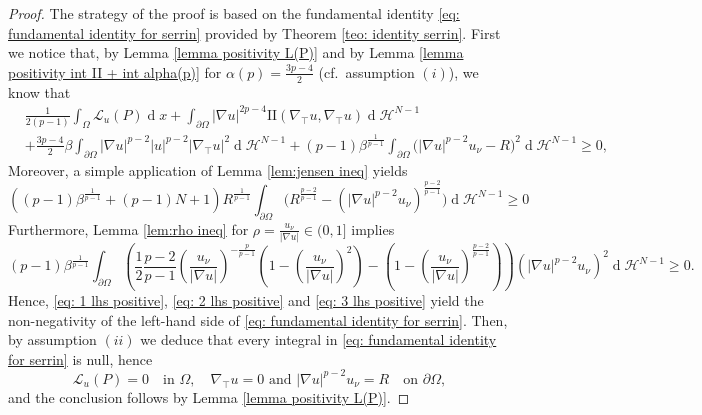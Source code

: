 \documentclass[10pt,a4paper]{amsart}
\numberwithin{equation}{section}
\renewcommand{\d}[1]{\ensuremath{\operatorname{d}\!{#1}}}
\begin{document}
\begin{proof}
    The strategy of the proof is based on the fundamental identity \eqref{eq: fundamental identity for serrin} provided by Theorem \ref{teo: identity serrin}. First we notice that, by Lemma \ref{lemma positivity L(P)} and by Lemma \ref{lemma positivity int II + int alpha(p)} for $\displaystyle \alpha(p)= \frac{3p-4}{2}$ (cf.\, assumption $(i)$), we know that  
    \begin{equation}\label{eq: 1 lhs positive}
    \begin{aligned}
    &\frac{1}{2(p-1)}\int_\Omega \mathcal{L}_u(P) \d{x} +\int_{\partial\Omega} |\nabla u|^{2p-4} \mathrm{I\!I}(\nabla_\top u,\nabla_\top u) \d{}\mathcal{H}^{N-1} 
    \\
    &+ \frac{3p-4}{2} \beta \int_{\partial\Omega} |\nabla u|^{p-2}|u|^{p-2}|\nabla_\top u|^2 \d{}\mathcal{H}^{N-1} 
    + (p-1) \beta^{\frac{1}{p-1}} \int_{\partial\Omega} \Big(|\nabla u|^{p-2} u_\nu - R \Big)^2  \d{}\mathcal{H}^{N-1}  \geq 0,
    \end{aligned}
    \end{equation}
    Moreover, a simple application of Lemma \ref{lem:jensen ineq} yields 
    \begin{equation}\label{eq: 2 lhs positive}
        \left( (p-1) \beta^{\frac{1}{p-1}} + (p-1)N + 1 \right) R^{\frac{1}{p-1}}  \int_{\partial\Omega} \Big( R^{\frac{p-2}{p-1}} - (|\nabla u|^{p-2} u_\nu)^{\frac{p-2}{p-1}} \Big)  \d{}\mathcal{H}^{N-1} \geq 0
    \end{equation}
    Furthermore, Lemma \ref{lem:rho ineq} for $\displaystyle \rho = \frac{u_\nu}{|\nabla u|} \in (0,1]$ implies 
    \begin{equation}\label{eq: 3 lhs positive}
        (p-1) \beta^{\frac{1}{p-1}}  \int_{\partial\Omega}  \left( \frac{1}{2} \frac{p-2}{p-1} \left(\frac{u_\nu}{|\nabla u|}\right)^{-\frac{p}{p-1}} \left(1- \left(\frac{u_\nu}{|\nabla u|}\right)^2 \right) - \left(1- \left(\frac{u_\nu}{|\nabla u|}\right)^{\frac{p-2}{p-1}} \right) \right) (|\nabla u|^{p-2} u_\nu)^2 \d{}\mathcal{H}^{N-1} \geq 0.
    \end{equation}
    Hence, \eqref{eq: 1 lhs positive}, \eqref{eq: 2 lhs positive} and \eqref{eq: 3 lhs positive} yield the non-negativity of the left-hand side of \eqref{eq: fundamental identity for serrin}. Then, by assumption $(ii)$ we deduce that every integral in \eqref{eq: fundamental identity for serrin} is null, hence
    \begin{equation*}
        \mathcal{L}_u(P) = 0 \quad\text{in } \Omega, \quad \nabla_\top u = 0 \text{ and } |\nabla u|^{p-2} u_\nu = R  \quad \text{on } \partial\Omega,
    \end{equation*}
    and the conclusion follows by Lemma \ref{lemma positivity L(P)}.
\end{proof}
    
\end{document}
